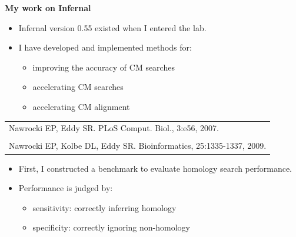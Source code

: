\documentclass[landscape]{slides}
\begin{document}
\begin{slide}
\begin{center}

\textbf{My work on Infernal}
\medskip

\small 
\begin{itemize}
\item Infernal version 0.55 existed when I entered the lab.

\item I have developed and implemented methods for:

\begin{itemize}
\item improving the accuracy of CM searches
\item accelerating CM searches
\item accelerating CM alignment
\end{itemize}
\end{itemize}

\begin{tabular}{l}
Nawrocki EP, Eddy SR. PLoS Comput. Biol., 3:e56, 2007. \\
\\
Nawrocki EP, Kolbe DL, Eddy SR. Bioinformatics, 25:1335-1337, 2009. \\
\end{tabular}
\end{center}

\bigskip

\small 
\begin{itemize}
\item First, I constructed a benchmark to evaluate homology search performance.

\item Performance is judged by:
  \begin{itemize}
    \item sensitivity: correctly inferring homology 
    \item specificity: correctly ignoring non-homology 
  \end{itemize}
\end{itemize}

\vfill 
\end{slide}
\end{document}
